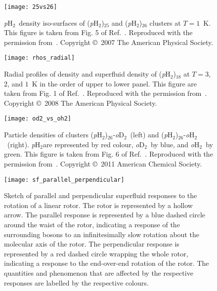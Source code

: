 \documentclass[12pt]{iopart}
\newcommand{\odtwo}{{\em o}D$_2$}
\newcommand{\phtwo}{{\em p}H$_2$}
\newcommand{\ohtwo}{{\em o}H$_2$}
\begin{document}
\begin{figure}[h] 
\centerline {\texttt{[image: 25vs26]}}
\caption{\phtwo~density iso-surfaces of (\phtwo)$_{25}$ and (\phtwo)$_{26}$ clusters at $T=1$~K. This figure is taken from Fig. 5 of Ref.~\cite{quantum_melting}. Reproduced with the permission from~\cite{quantum_melting}. Copyright \copyright~2007 The American Physical Society.} 
\label{fig:25vs26}
\end{figure}

\begin{figure}[h] 
\centerline {\texttt{[image: rhos\_radial]}}
\caption{Radial profiles of density and superfluid density of (\phtwo)$_{18}$ at $T=3$, $2$, and $1$~K in the order of upper to lower panel. This figure are taken from Fig. 1 of Ref.~\cite{local_sup_boninsegni}. Reproduced with the permission from~\cite{local_sup_boninsegni}. Copyright \copyright~2008 The American Physical Society.} 
\label{fig:rhos_radial}
\end{figure}

\clearpage

\begin{figure}[h] 
\centerline {\texttt{[image: od2\_vs\_oh2]}}
\caption{Particle densities of clusters (\phtwo)$_{26}$-\odtwo~(left) and (\phtwo)$_{26}$-\ohtwo~(right). \phtwo are represented by red colour, \odtwo~by blue, and \ohtwo~by green. This figure is taken from Fig. 6 of Ref.~\cite{mezzacapo_supersolid}. Reproduced with the permission from~\cite{mezzacapo_supersolid}. Copyright \copyright~2011 American Chemical Society.} 
\label{fig:od2_vs_oh2}
\end{figure}

\begin{figure}[h]
\centerline {\texttt{[image: sf\_parallel\_perpendicular]}}
\caption{Sketch of parallel and perpendicular superfluid responses to the rotation of a linear rotor. The rotor is represented by a hollow arrow. The parallel response is represented by a blue dashed circle around the waist of the rotor, indicating a response of the surrounding bosons to an infinitesimally slow rotation about the molecular axis of the rotor. The perpendicular response is represented by a red dashed circle wrapping the whole rotor, indicating a response to the end-over-end rotation of the rotor. The quantities and phenomenon that are affected by the respective responses are labelled by the respective colours.} 
\label{fig:sf_paral_perp}
\end{figure}
\end{document}
